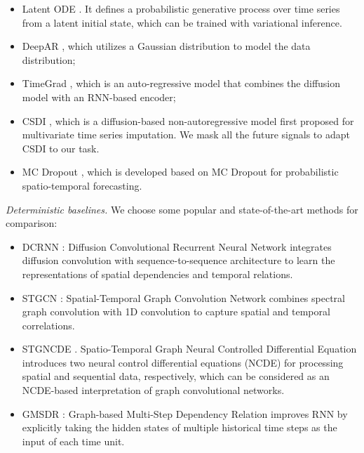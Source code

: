 {\begin{itemize}[leftmargin=*]
    \item Latent ODE \cite{rubanova2019latent}. It defines a probabilistic generative process over time series from a latent initial state, which can be trained with variational inference.
    \item DeepAR \cite{salinas2020deepar}, which utilizes a Gaussian distribution to model the data distribution; 
    \item TimeGrad \cite{rasul2021autoregressive}, which is an auto-regressive model that combines the diffusion model with an RNN-based encoder; 
    \item CSDI \cite{tashiro2021csdi}, which is a diffusion-based non-autoregressive model first proposed for multivariate time series imputation. We mask all the future signals to adapt CSDI to our task.
    \item MC Dropout \cite{wu2021quantifying}, which is developed based on MC Dropout \cite{gal2017concrete} for probabilistic spatio-temporal forecasting.
\end{itemize}

\par \textit{Deterministic baselines.} We choose some popular and state-of-the-art methods for comparison:
\begin{itemize}[leftmargin=*]

    \item DCRNN \cite{li2018diffusion}: Diffusion Convolutional Recurrent Neural Network integrates diffusion convolution with sequence-to-sequence architecture to learn the representations of spatial dependencies and temporal relations.
    
    \item STGCN \cite{STGCN-2018}: Spatial-Temporal Graph Convolution Network combines spectral graph convolution with 1D convolution to capture spatial and temporal correlations. 

    \item STGNCDE \cite{choi2022graph}. Spatio-Temporal Graph Neural Controlled Differential Equation introduces two neural control differential equations (NCDE) for processing
spatial and sequential data, respectively, which can be considered as an NCDE-based interpretation
of graph convolutional networks.

    \item GMSDR \cite{liu2022msdr}: Graph-based Multi-Step Dependency Relation improves RNN by explicitly taking the hidden states of multiple historical time steps as the input of each time unit.


\end{itemize}}
